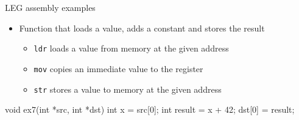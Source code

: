 \begin{frame}[fragile]{LEG assembly examples}

\begin{itemize}
    \item Function that loads a value, adds a constant and stores the result
    \begin{itemize}
        \item \texttt{ldr} loads a value from memory at the given address
        \item \texttt{mov} copies an immediate value to the register
        \item \texttt{str} stores a value to memory at the given address
    \end{itemize}
\end{itemize}

\begin{minipage}[t]{0.50\linewidth}
\begin{codebox}
void ex7(int *src, int *dst) {
    int x = src[0];
    int result = x + 42;
    dst[0] = result;
}

\end{codebox}
\end{minipage}
\begin{minipage}[t]{0.49\linewidth}
\end{minipage}

\end{frame}


